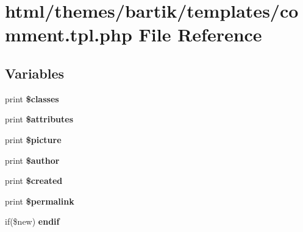 \hypertarget{themes_2bartik_2templates_2comment_8tpl_8php}{
\section{html/themes/bartik/templates/comment.tpl.php File Reference}
\label{themes_2bartik_2templates_2comment_8tpl_8php}
}
\subsection*{Variables}
\begin{DoxyCompactItemize}
\item 
\hypertarget{themes_2bartik_2templates_2comment_8tpl_8php_a6d48ecbdbc70ca1812e665169b5fa1e2}{
print {\bfseries \$classes}}
\label{themes_2bartik_2templates_2comment_8tpl_8php_a6d48ecbdbc70ca1812e665169b5fa1e2}

\item 
\hypertarget{themes_2bartik_2templates_2comment_8tpl_8php_a9c88c4272fa40546577b45392a0b3cd3}{
print {\bfseries \$attributes}}
\label{themes_2bartik_2templates_2comment_8tpl_8php_a9c88c4272fa40546577b45392a0b3cd3}

\item 
\hypertarget{themes_2bartik_2templates_2comment_8tpl_8php_abb12f8c31dba99f68efccffe9434082c}{
print {\bfseries \$picture}}
\label{themes_2bartik_2templates_2comment_8tpl_8php_abb12f8c31dba99f68efccffe9434082c}

\item 
\hypertarget{themes_2bartik_2templates_2comment_8tpl_8php_ad41162246456aab359d74dc087c8cf60}{
print {\bfseries \$author}}
\label{themes_2bartik_2templates_2comment_8tpl_8php_ad41162246456aab359d74dc087c8cf60}

\item 
\hypertarget{themes_2bartik_2templates_2comment_8tpl_8php_a292d27fd11f03f329a64c867483273ff}{
print {\bfseries \$created}}
\label{themes_2bartik_2templates_2comment_8tpl_8php_a292d27fd11f03f329a64c867483273ff}

\item 
\hypertarget{themes_2bartik_2templates_2comment_8tpl_8php_aa6e866865d65b663d634e32df9f1d64a}{
print {\bfseries \$permalink}}
\label{themes_2bartik_2templates_2comment_8tpl_8php_aa6e866865d65b663d634e32df9f1d64a}

\item 
\hypertarget{themes_2bartik_2templates_2comment_8tpl_8php_ae34e3891308810ab87f2e2b1c2a2b951}{
if(\$new) {\bfseries endif}}
\label{themes_2bartik_2templates_2comment_8tpl_8php_ae34e3891308810ab87f2e2b1c2a2b951}


\end{DoxyCompactItemize}
